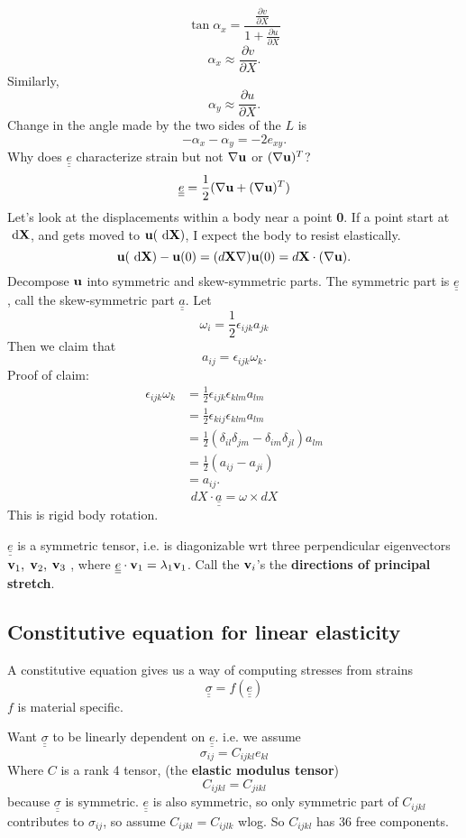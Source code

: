 \documentclass[12pt]{article}
\newcommand{\uu}{{\bf u}}
\newcommand{\vv}{{\bf v}}
\newcommand{\bX}{{\bf X}}
\newcommand{\bnabla}{{\bf \nabla}}
\newcommand{\ssigma}{{\underline{\underline \sigma}}}
\newcommand{\te}{{\underline{\underline e}}}
\newcommand{\ta}{{\underline{\underline a}}}
\newcommand{\dx}[1]{\text{ d}#1}
\begin{document}
\[
\tan \alpha_x = \frac{ \frac{\partial v}{\partial X}}{1 +  \frac{\partial u}{\partial X}}
\]
\[
\alpha_x\approx  \frac{\partial v}{\partial X}.
\]
Similarly,
\[
\alpha_y\approx  \frac{\partial u}{\partial X}.
\]
Change in the angle made by the two sides of the $L$ is 
\[
-\alpha_x -\alpha_y = -2e_{xy}.
\]
Why does $\underline{\underline e}$ characterize strain but not $\bnabla\uu$ or $(\bnabla\uu)^T$?\[
\underline{\underline e} = \frac 1 2 (\bnabla\uu + (\bnabla\uu)^T)
\]
Let's look at the displacements within a body near a point {\bf 0}. If a point start at $\dx{\bX}$, and gets moved to $\uu(\dx{\bX} )$, I expect the body to resist elastically.
\[
\uu(\dx{\bX}) - \uu(0) = (d\bX \bnabla) \uu(0) = d\bX\cdot(\bnabla \uu).
\] 
Decompose $\uu$ into symmetric and skew-symmetric parts. The symmetric part is $\te$, call the skew-symmetric part $\ta$. Let
\[
\omega_i = \frac 1 2 \epsilon_{ijk}a_{jk}
\]
Then we claim that 
\[
a_{ij} = \epsilon_{ijk}\omega_k.
\]
Proof of claim:
\begin{align*}
\epsilon_{ijk}\omega_k &= \frac 1 2  \epsilon_{ijk}  \epsilon_{klm} a_{lm} \\
&=  \frac 1 2  \epsilon_{kij}  \epsilon_{klm} a_{lm}\\
&=\frac 1 2 (\delta_{il}\delta_{jm} - \delta_{im}\delta_{jl})a_{lm}\\
&= \frac 1 2 (a_{ij} - a_{ji}) \\
&= a_{ij}.
\end{align*}
\[
dX\cdot \ta = \omega\times dX
\]
This is rigid body rotation.


$\te$ is a symmetric tensor, i.e. is diagonizable wrt three perpendicular eigenvectors $\vv_1,$ $\vv_2,$ $\vv_3$ , where $\te\cdot \vv_1 = \lambda_1\vv_1$. Call the $\vv_i$'s the {\bf  directions of principal stretch}.




\subsection{Constitutive equation for linear elasticity}
A constitutive equation gives us a way of computing stresses from strains
\[
\ssigma  = f(\te)
\]
$f$ is material specific.

Want $\ssigma$ to be linearly dependent on $\te$. 
i.e. we assume
\[
\sigma_{ij} = C_{ijkl}e_{kl}
\]
Where $C$ is a rank 4 tensor, (the {\bf elastic modulus tensor})
\[
C_{ijkl} = C_{jikl}
\]
because $\ssigma$ is symmetric.
$\te$ is also symmetric, so only symmetric part of $C_{ijkl}$ contributes to $\sigma_{ij}$, so assume $C_{ijkl} = C_{ijlk}$ wlog. So $C_{ijkl}$ has 36 free components.
\end{document}
